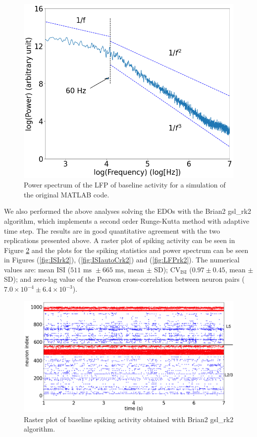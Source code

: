 \begin{figure}[H]
    \centering
    \includegraphics[scale=0.3]{LFPoriginal2.png}
    \caption{Power spectrum of the LFP of baseline activity for a simulation of the original MATLAB code.}
    \label{fig:LFPoriginal}
\end{figure}

We also performed the above analyses solving the EDOs with the Brian2 gsl\_rk2 algorithm, which implements a second order Runge-Kutta method with adaptive time step. The results are in good quantitative agreement with the two replications presented above. A raster plot of spiking activity can be seen in Figure \ref{fig:mainrasterrk2} and the plots for the spiking statistics and power spectrum can be seen in Figures (\ref{fig:ISIrk2}), (\ref{fig:ISIautoCrk2}) and (\ref{fig:LFPrk2}). The numerical values are: mean ISI ($511 \text{ ms } \pm 665 \text{ ms}$, mean $\pm$ SD); CV$_{\text{ISI}}$ ($0.97 \pm 0.45$, mean $\pm$ SD); and zero-lag value of the Pearson cross-correlation between neuron pairs ($7.0 \times 10^{-4} \pm 6.4 \times 10^{-3}$).\\ 

\begin{figure}[H]
    \centering
    \includegraphics[scale=0.3]{mainrasterplotrk2.png}
    \caption{Raster plot of baseline spiking activity obtained with Brian2 gsl\_rk2 algorithm.}
    \label{fig:mainrasterrk2}
\end{figure}

